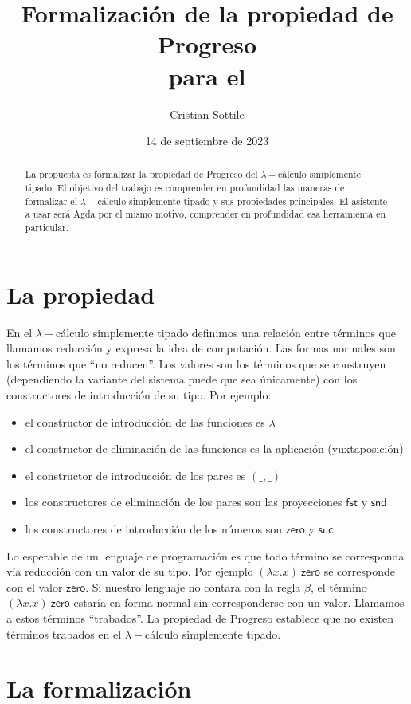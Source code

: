 \documentclass{article}
\title{Formalización de la propiedad de Progreso\\para el \stlcw}
\author{Cristian Sottile}
\date{14 de septiembre de 2023}
\newcommand{\stlcw}{$\lambda-$cálculo simplemente tipado\xspace}
\newcommand{\n}[1]{\ensuremath{\mathsf{#1}}}
\begin{document}
\maketitle

\begin{abstract}
  La propuesta es formalizar la propiedad de Progreso del \stlcw. El objetivo del
  trabajo es comprender en profundidad las maneras de formalizar el \stlcw y sus
  propiedades principales. El asistente a usar será Agda por el mismo motivo,
  comprender en profundidad esa herramienta en particular.

\end{abstract}

\section{La propiedad}

En el \stlcw definimos una relación entre
términos que llamamos reducción y expresa la idea de computación. Las formas
normales son los términos que “no reducen”. Los valores son los términos que se
construyen (dependiendo la variante del sistema puede que sea únicamente) con
los constructores de introducción de su tipo. Por ejemplo:

\begin{itemize}
\item el constructor de introducción de las funciones es $\lambda$
\item el constructor de eliminación de las funciones es la aplicación
  (yuxtaposición)
\item el constructor de introducción de los pares es $(\_,\_)$
\item los constructores de eliminación de los pares son las proyecciones
  \n{fst} y \n{snd}
\item los constructores de introducción de los números son \n{zero} y \n{suc}
\end{itemize}

Lo esperable de un lenguaje de programación es que todo término se corresponda
vía reducción con un valor de su tipo. Por ejemplo $(\lambda x.x)\ \n{zero}$ se
corresponde con el valor \n{zero}. Si nuestro lenguaje no contara con la regla
$\beta$, el término $(\lambda x.x)\ \n{zero}$ estaría en forma normal sin
corresponderse con un valor. Llamamos a estos términos “trabados”. La propiedad
de Progreso establece que no existen términos trabados en el \stlcw.

\section{La formalización}
\end{document}
